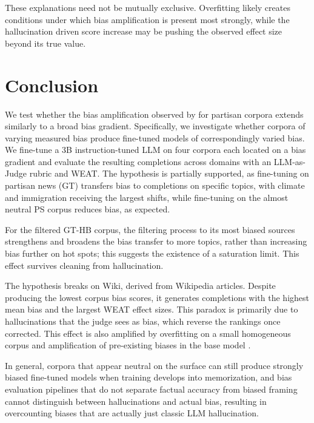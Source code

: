 \documentclass[11pt]{article}
\begin{document}
These explanations need not be mutually exclusive. 
Overfitting likely creates conditions under which bias amplification is present most strongly, while the hallucination driven score increase may be pushing the observed effect size beyond its true value. 

\section{Conclusion}
We test whether the bias amplification observed by \citet{wang2024bias} for partisan corpora extends similarly to a broad bias gradient.
Specifically, we investigate whether corpora of varying measured bias produce fine-tuned models of correspondingly varied bias.
We fine-tune a 3B instruction-tuned LLM on four corpora each located on a bias gradient and evaluate the resulting completions across domains with an LLM-as-Judge rubric and WEAT.
The hypothesis is partially supported, as fine-tuning on partisan news (GT) transfers bias to completions on specific topics, with climate and immigration receiving the largest shifts, while fine-tuning on the almost neutral PS corpus reduces bias, as expected.

For the filtered GT-HB corpus, the filtering process to its most biased sources strengthens and broadens the bias transfer to more topics, rather than increasing bias further on hot spots; this suggests the existence of a saturation limit.
This effect survives cleaning from hallucination.

The hypothesis breaks on Wiki, derived from Wikipedia articles.
Despite producing the lowest corpus bias scores, it generates completions with the highest mean bias and the largest WEAT effect sizes.
This paradox is primarily due to hallucinations that the judge sees as bias, which reverse the rankings once corrected.
This effect is also amplified by overfitting on a small homogeneous corpus and amplification of pre-existing biases in the base model \cite{wang2024bias}.

In general, corpora that appear neutral on the surface can still produce strongly biased fine-tuned models when training develops into memorization, and bias evaluation pipelines that do not separate factual accuracy from biased framing cannot distinguish between hallucinations and actual bias, resulting in overcounting biases that are actually just classic LLM hallucination.

\end{document}
